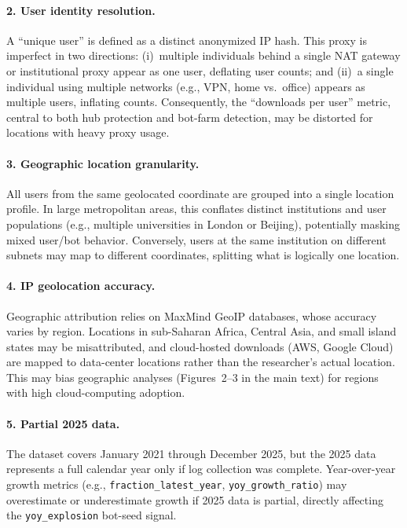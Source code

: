 \documentclass[11pt,a4paper]{article}
\begin{document}
\paragraph{2. User identity resolution.}
A ``unique user'' is defined as a distinct anonymized IP hash.
This proxy is imperfect in two directions: (i)~multiple individuals behind a single NAT gateway or institutional proxy appear as one user, deflating user counts; and (ii)~a single individual using multiple networks (e.g., VPN, home vs.\ office) appears as multiple users, inflating counts.
Consequently, the ``downloads per user'' metric, central to both hub protection and bot-farm detection, may be distorted for locations with heavy proxy usage.

\paragraph{3. Geographic location granularity.}
All users from the same geolocated coordinate are grouped into a single location profile.
In large metropolitan areas, this conflates distinct institutions and user populations (e.g., multiple universities in London or Beijing), potentially masking mixed user/bot behavior.
Conversely, users at the same institution on different subnets may map to different coordinates, splitting what is logically one location.

\paragraph{4. IP geolocation accuracy.}
Geographic attribution relies on MaxMind GeoIP databases, whose accuracy varies by region.
Locations in sub-Saharan Africa, Central Asia, and small island states may be misattributed, and cloud-hosted downloads (AWS, Google Cloud) are mapped to data-center locations rather than the researcher's actual location.
This may bias geographic analyses (Figures~2--3 in the main text) for regions with high cloud-computing adoption.

\paragraph{5. Partial 2025 data.}
The dataset covers January 2021 through December 2025, but the 2025 data represents a full calendar year only if log collection was complete.
Year-over-year growth metrics (e.g., \texttt{fraction\_latest\_year}, \texttt{yoy\_growth\_ratio}) may overestimate or underestimate growth if 2025 data is partial, directly affecting the \texttt{yoy\_explosion} bot-seed signal.
\end{document}
